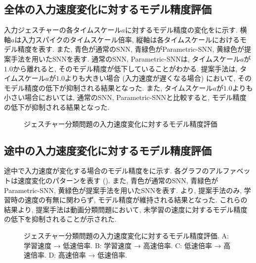 \subsection{全体の入力速度変化に対するモデル精度評価}
入力ジェスチャーの各タイムスケール$a$に対するモデル精度の変化をに示す.
横軸$a$は入力スパイクのタイムスケール倍率, 縦軸は各タイムスケールにおけるモデル精度を表す.
また, 青色が通常のSNN, 青緑色がParametric-SNN, 黄緑色が提案手法を用いたSNNを表す.
通常のSNN, Parametric-SNNは, タイムスケール$a$が$1.0$から離れると, そのモデル精度が低下していることがわかる.
提案手法は, タイムスケール$a$が$1.0$よりも大きい場合 (入力速度が遅くなる場合) において, そのモデル精度の低下が抑制される結果となった.
また, タイムスケール$a$が$1.0$よりも小さい場合においては, 通常のSNN, Parametric-SNNと比較すると, モデル精度の低下が抑制される結果となった.
\begin{figure}[htb]
    \centering
    
    \caption{ジェスチャー分類問題の入力速度変化に対するモデル精度評価}
    \label{fig:result2:eval1}
\end{figure}


\subsection{途中の入力速度変化に対するモデル精度評価}
途中で入力速度が変化する場合のモデル精度をに示す.
各グラフのアルファベットは速度変化のパターンを表す ().
また, 青色が通常のSNN, 青緑色がParametric-SNN, 黄緑色が提案手法を用いたSNNを表す.
より, 提案手法のみ, 学習時の速度の有無に関わらず, モデル精度が維持される結果となった.
これらの結果より, 提案手法は動画分類問題において, 未学習の速度に対するモデル精度の低下を抑制されることが示された.
\begin{figure}[htb]
    \centering
    
    \caption[ジェスチャー分類問題の入力速度変化に対するモデル精度評価]{
        ジェスチャー分類問題の入力速度変化に対するモデル精度評価.
        A: 学習速度 → 低速倍率.
        B: 学習速度 → 高速倍率.
        C: 低速倍率 → 高速倍率.
        D: 高速倍率 → 低速倍率.    
    }
    \label{fig:result2:eval2}
\end{figure}


